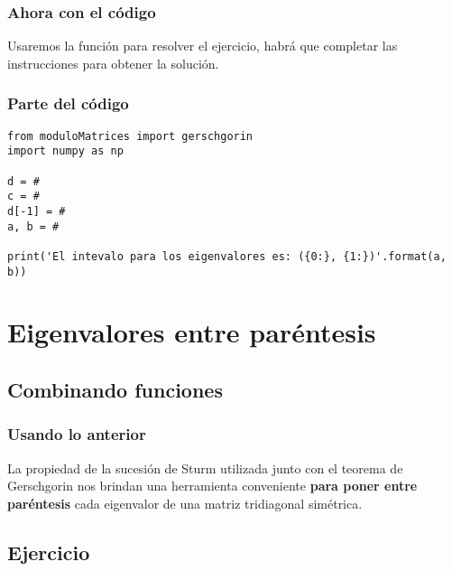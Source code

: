 \documentclass[12pt]{beamer}
\begin{document}
\begin{frame}
\frametitle{Ahora con el código}
Usaremos la función para resolver el ejercicio, habrá que completar las instrucciones para obtener la solución.
\end{frame}
\begin{frame}
\frametitle{Parte del código}
\begin{lstlisting}[caption=Parte del código para poner paréntesis a los eigenvalores]
from moduloMatrices import gerschgorin
import numpy as np

d = #
c = #
d[-1] = #
a, b = #

print('El intevalo para los eigenvalores es: ({0:}, {1:})'.format(a, b))
\end{lstlisting}
\end{frame}

\section{Eigenvalores entre paréntesis}
\subsection{Combinando funciones}

\begin{frame}
\frametitle{Usando lo anterior}
La propiedad de la sucesión de Sturm utilizada junto con el teorema de Gerschgorin nos brindan una herramienta conveniente \textbf{\textcolor{lava}{para poner entre paréntesis}} cada eigenvalor de una matriz tridiagonal simétrica.
\end{frame}

\subsection{Ejercicio}
\end{document}
